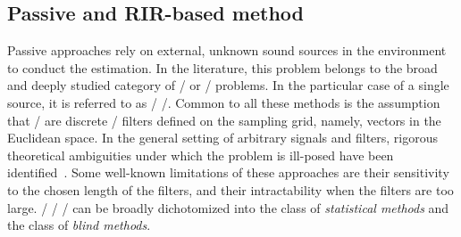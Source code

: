 \subsection{Passive and RIR-based method}\label{subsec:estimation:bce}
Passive approaches
 rely on external, unknown sound sources in the environment to conduct the estimation.
In the literature, this problem belongs to the broad and deeply studied category of \BCEdef/ or \BSIdef/ problems.
In the particular case of a single source, it is referred to as \SIMO/ \BCE/.
Common to all these methods is the assumption that \RIRs/ are discrete \FIR/ filters defined on the sampling grid, namely, vectors in the Euclidean space.
In the general setting of arbitrary signals and filters, rigorous theoretical ambiguities under which the problem is ill-posed have been identified~.
Some well-known limitations of these approaches are their sensitivity to the chosen length of the filters, and their intractability when the filters are too large.
\FIR/ \SIMO/ \BCE/ can be broadly dichotomized into the class of \textit{statistical methods} and the class of \textit{blind methods}.

